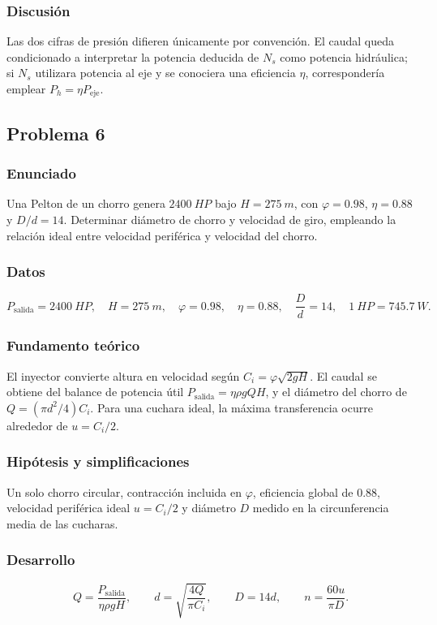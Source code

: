 \documentclass[12pt]{article}
\begin{document}
\subsubsection*{Discusión}
Las dos cifras de presión difieren únicamente por convención. El caudal queda condicionado
a interpretar la potencia deducida de $N_s$ como potencia hidráulica; si $N_s$ utilizara
potencia al eje y se conociera una eficiencia $\eta$, correspondería emplear
$P_h=\eta P_{\mathrm{eje}}$.

\subsection{Problema 6}

\subsubsection*{Enunciado}
Una Pelton de un chorro genera $\SI{2400}{HP}$ bajo $H=\SI{275}{m}$, con
$\varphi=0.98$, $\eta=0.88$ y $D/d=14$. Determinar diámetro de chorro y velocidad de giro,
empleando la relación ideal entre velocidad periférica y velocidad del chorro.

\subsubsection*{Datos}
\[
P_{\mathrm{salida}}=\SI{2400}{HP},\quad H=\SI{275}{m},\quad
\varphi=0.98,\quad\eta=0.88,\quad \frac{D}{d}=14,
\quad \SI{1}{HP}=\SI{745.7}{W}.
\]

\subsubsection*{Fundamento teórico}
El inyector convierte altura en velocidad según
$C_i=\varphi\sqrt{2gH}$. El caudal se obtiene del balance de potencia útil
$P_{\mathrm{salida}}=\eta\rho gQH$, y el diámetro del chorro de
$Q=(\pi d^2/4)C_i$. Para una cuchara ideal, la máxima transferencia ocurre alrededor de
$u=C_i/2$.

\subsubsection*{Hipótesis y simplificaciones}
Un solo chorro circular, contracción incluida en $\varphi$, eficiencia global de 0.88,
velocidad periférica ideal $u=C_i/2$ y diámetro $D$ medido en la circunferencia media de
las cucharas.

\subsubsection*{Desarrollo}
\[
Q=\frac{P_{\mathrm{salida}}}{\eta\rho gH},\qquad
d=\sqrt{\frac{4Q}{\pi C_i}},\qquad D=14d,
\qquad n=\frac{60u}{\pi D}.
\]
\end{document}
